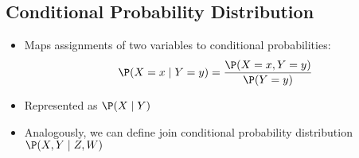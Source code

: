 \subsection{Conditional Probability Distribution}
	\begin{frame}
		\begin{itemize}
			\item Maps assignments of two variables to conditional probabilities:
				\[ \P( X = x \mid Y = y ) = \frac{\P( X = x , Y = y )}{\P( Y = y )} \]
			\item Represented as $\P( X \mid Y )$
			\item Analogously, we can define join conditional probability distribution $\P( X , Y \mid Z , W )$
		\end{itemize}
	\end{frame}